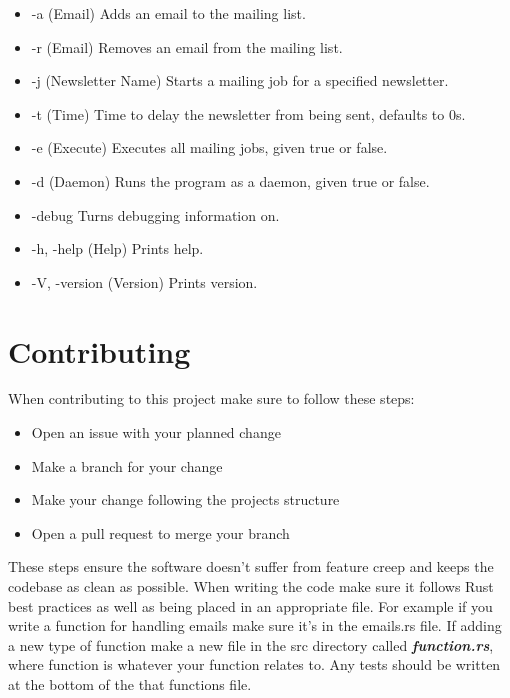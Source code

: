 \documentclass[12pt]{article}
\begin{document}
\begin{itemize}
    \item -a (Email) Adds an email to the mailing list.
    \item -r (Email) Removes an email from the mailing list.
    \item -j (Newsletter Name) Starts a mailing job for a specified newsletter. 
    \item -t (Time) Time to delay the newsletter from being sent, defaults to 
        0s.
    \item -e (Execute) Executes all mailing jobs, given true or false.
    \item -d (Daemon) Runs the program as a daemon, given true or false. 
    \item -\-debug Turns debugging information on.
    \item -h, -\-help (Help) Prints help.
    \item -V, -\-version (Version) Prints version.
\end{itemize}

\section{Contributing}
When contributing to this project make sure to follow these steps:

\begin{itemize}
    \item Open an issue with your planned change
    \item Make a branch for your change
    \item Make your change following the projects structure
    \item Open a pull request to merge your branch
\end{itemize}

These steps ensure the software doesn't suffer from feature creep and keeps the 
codebase as clean as possible. When writing the code make sure it follows Rust 
best practices as well as being placed in an appropriate file. For example if 
you write a function for handling emails make sure it's in the emails.rs file. 
If adding a new type of function make a new file in the src directory 
called \textbf{\textit{function.rs}}, where function is whatever your function 
relates to. Any tests should be written at the bottom of the that functions file.
\end{document}
